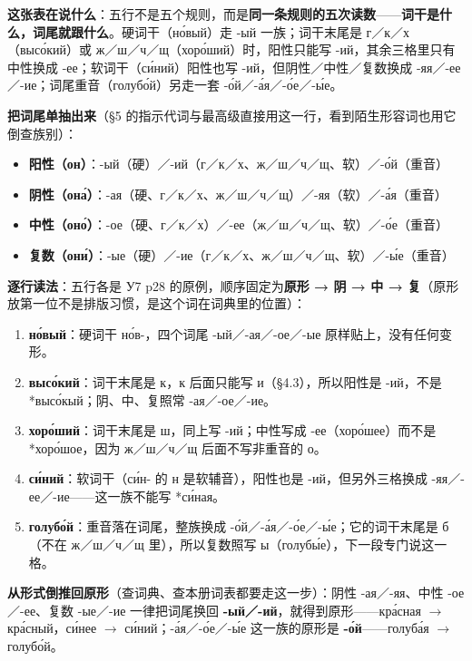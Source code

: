 \textbf{这张表在说什么}：五行不是五个规则，而是\textbf{同一条规则的五次读数}——\textbf{词干是什么，词尾就跟什么}。硬词干（но́вый）走 -ый 一族；词干末尾是 г／к／х（высо́кий）或 ж／ш／ч／щ（хоро́ший）时，阳性只能写 -ий，其余三格里只有中性换成 -ее；软词干（си́ний）阳性也写 -ий，但阴性／中性／复数换成 -яя／-ее／-ие；词尾重音（голубо́й）另走一套 -о́й／-а́я／-о́е／-ы́е。

\textbf{把词尾单抽出来}（\S5 的指示代词与最高级直接用这一行，看到陌生形容词也用它倒查族别）：

\begin{itemize}
\item \textbf{阳性（он）}：-ый（硬）／-ий（г／к／х、ж／ш／ч／щ、软）／-о́й（重音）
\item \textbf{阴性（она́）}：-ая（硬、г／к／х、ж／ш／ч／щ）／-яя（软）／-а́я（重音）
\item \textbf{中性（оно́）}：-ое（硬、г／к／х）／-ее（ж／ш／ч／щ、软）／-о́е（重音）
\item \textbf{复数（они́）}：-ые（硬）／-ие（г／к／х、ж／ш／ч／щ、软）／-ы́е（重音）
\end{itemize}

\textbf{逐行读法}：五行各是 У7 p28 的原例，顺序固定为\textbf{原形 → 阴 → 中 → 复}（原形放第一位不是排版习惯，是这个词在词典里的位置）：

\begin{enumerate}
\item \textbf{но́вый}：硬词干 но́в-，四个词尾 -ый／-ая／-ое／-ые 原样贴上，没有任何变形。
\item \textbf{высо́кий}：词干末尾是 к，к 后面只能写 и（\S4.3），所以阳性是 -ий，不是 *высо́кый；阴、中、复照常 -ая／-ое／-ие。
\item \textbf{хоро́ший}：词干末尾是 ш，同上写 -ий；中性写成 -ее（хоро́шее）而不是 *хоро́шое，因为 ж／ш／ч／щ 后面不写非重音的 о。
\item \textbf{си́ний}：软词干（си́н- 的 н 是软辅音），阳性也是 -ий，但另外三格换成 -яя／-ее／-ие——这一族不能写 *си́ная。
\item \textbf{голубо́й}：重音落在词尾，整族换成 -о́й／-а́я／-о́е／-ы́е；它的词干末尾是 б（不在 ж／ш／ч／щ 里），所以复数照写 ы（голубы́е），下一段专门说这一格。
\end{enumerate}

\textbf{从形式倒推回原形}（查词典、查本册词表都要走这一步）：阴性 -ая／-яя、中性 -ое／-ее、复数 -ые／-ие 一律把词尾换回 \textbf{-ый／-ий}，就得到原形——кра́сная $\to$ кра́сный，си́нее $\to$ си́ний；-а́я／-о́е／-ы́е 这一族的原形是 \textbf{-о́й}——голуба́я $\to$ голубо́й。

